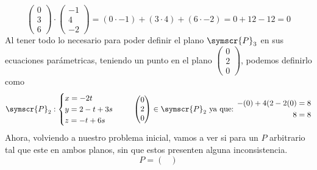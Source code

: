 \documentclass{article}
\def\fancyP{\symscr{P}}
\begin{document}
\begin{enumerate}
\begin{itemize}
\begin{itemize}
\[\begin{pmatrix}
                            0 \\ 3 \\ 6
                        \end{pmatrix}
                        \cdot
                        \begin{pmatrix}
                            -1 \\ 4 \\ -2
                        \end{pmatrix}
                        =
                        (0 \cdot -1) + (3 \cdot 4) + (6 \cdot -2)
                        =
                        0 + 12 - 12
                        =
                        0
                    \]
                    Al tener todo lo necesario para poder definir el plano \(\fancyP_3\) en sus ecuaciones parámetricas, teniendo un punto en el plano \(\left(\begin{smallmatrix}0 \\ 2 \\ 0\end{smallmatrix}\right)\), 
                    podemos definirlo como
                    \[
                        \fancyP_2: \begin{cases}
                            x = -2t \\
                            y = 2 -t + 3s \\
                            z = -t + 6s
                        \end{cases}
                        \hspace{0.5cm}
                        \begin{pmatrix}
                            0 \\ 2 \\ 0
                        \end{pmatrix}
                        \in
                        \fancyP_2
                        \text{ ya que: }
                        \begin{aligned}
                            -(0) + 4(2 -2(0) &= 8 \\
                            8 &= 8 \\
                        \end{aligned}
                    \]
                    Ahora, volviendo a nuestro problema inicial, vamos a ver si para un \(P\) arbitrario tal que este en ambos planos, sin que estos presenten alguna inconsistencia.
                    \[
                        P = 
                        \begin{pmatrix}

\end{pmatrix}\]
\end{itemize}
\end{itemize}
\end{enumerate}
\end{document}
